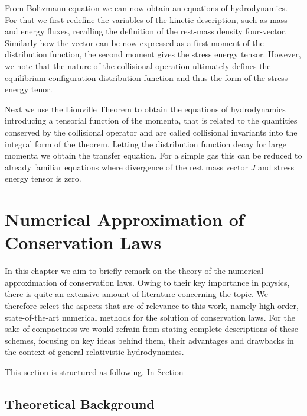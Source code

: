 From Boltzmann equation we can now obtain an equations of hydrodynamics. For that we first redefine the variables of the kinetic description, such as mass and energy fluxes, recalling the definition of the rest-mass density four-vector. 
Similarly how the vector can be now expressed as a first moment of the distribution function, the second moment gives the stress energy tensor. However, we note that the nature of the collisional operation ultimately defines the equilibrium configuration distribution function and thus the form of the stress-energy tenor.

Next we use the Liouville Theorem to obtain the equations of hydrodynamics introducing a tensorial function of the momenta, that is related to the quantities conserved by the collisional operator and are called collisional invariants into the integral form of the theorem. 
Letting the distribution function decay for large momenta we obtain the transfer equation. 
For a simple gas this can be reduced to already familiar equations where divergence of the rest mass vector $J$ and stress energy tensor is zero.



\section{Numerical Approximation of Conservation Laws}



In this chapter we aim to briefly remark on the theory of the numerical approximation of conservation laws. 
Owing to their key importance in physics, there is quite an extensive amount of literature concerning the topic. 
We therefore select the aspects that are of relevance to this work, namely high-order, state-of-the-art numerical methods for the solution of conservation laws. 
For the sake of compactness we would refrain from stating complete descriptions of these schemes, focusing on key ideas behind them, their advantages and drawbacks in the context of general-relativistic hydrodynamics.

This section is structured as following. 
In Section 

\subsection{Theoretical Background}

